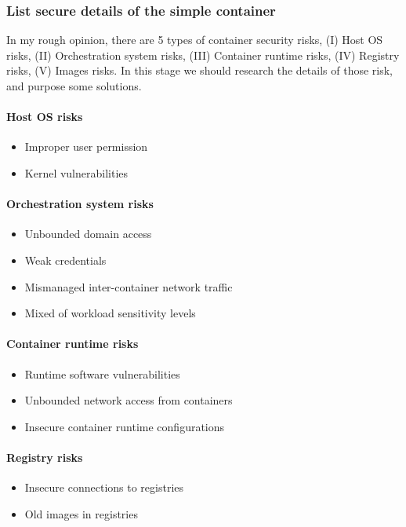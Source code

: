 \documentclass[12pt,a4paper]{IEEEconf}
\begin{document}
\subsubsection{List secure details of the simple container}
In my rough opinion, there are 5 types of container security risks, (\RN{1}) Host OS risks, (\RN{2})
Orchestration system risks, (\RN{3}) Container runtime risks, (\RN{4}) Registry risks, (\RN{5})
Images risks. In this stage we should research the details of those risk, and purpose some solutions.

\paragraph{Host OS risks}
\begin{itemize}
  \item Improper user permission
  \item Kernel vulnerabilities
\end{itemize}

\paragraph{Orchestration system risks}
\begin{itemize}
  \item Unbounded domain access
  \item Weak credentials
  \item Mismanaged inter-container network traffic
  \item Mixed of workload sensitivity levels
\end{itemize}

\paragraph{Container runtime risks}
\begin{itemize}
  \item Runtime software vulnerabilities
  \item Unbounded network access from containers
  \item Insecure container runtime configurations
\end{itemize}

\paragraph{Registry risks}
\begin{itemize}
  \item Insecure connections to registries
  \item Old images in registries
\end{itemize}
\end{document}
